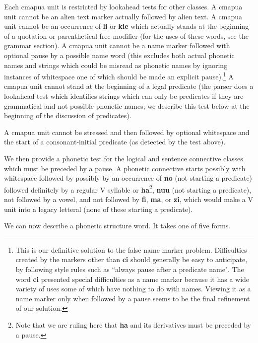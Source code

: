 \documentclass[12pt]{book}
\begin{document}
Each cmapua unit is restricted by lookahead tests for other classes.  A cmapua unit cannot be an alien text marker actually followed by alien text.  A cmapua unit cannot be an occurrence of {\bf li} or {\bf kie} which actually stands at the beginning of a quotation or parenthetical free modifier (for the uses of these words, see the grammar section).  A cmapua unit cannot be a name marker followed with optional pause by a possible name word (this excludes both
actual phonetic names and strings which could be misread as phonetic names by ignoring instances of whitespace one of which should be made an explicit pause).\footnote{This is our definitive solution to the false name marker problem.  Difficulties created by the markers other than {\bf ci} should generally be easy to anticipate, by following style rules such as ``always pause after a predicate name".  The word {\bf ci} presented special difficulties as a name marker because it has a wide variety of uses some of which have nothing to do with names.  Viewing it as a name marker only when followed by a pause seems to be the final refinement of our solution.}   A cmapua unit
cannot stand at the beginning of a legal predicate (the parser  does a lookahead test which identifies strings which can only be predicates if they are grammatical and not possible phonetic names;  we describe this test below at the beginning of the discussion of predicates).  

A cmapua unit cannot be stressed and then followed by optional whitespace and the start of a consonant-initial predicate (as detected by the test above).

We then provide a phonetic test for the logical and sentence connective classes which must be preceded by a pause.  A phonetic connective starts possibly with whitespace followed by possibly by an occurrence of 
{\bf no} (not starting a predicate) followed definitely by a regular V syllable or {\bf ha}\footnote{Note that we are ruling here that {\bf ha} and its derivatives must be preceded by a pause.}, {\bf nuu} (not starting a predicate), not followed by a vowel, and not followed by {\bf fi}, {\bf ma}, or {\bf zi}, which would make a V unit into a legacy letteral (none of these starting a predicate).

We can now describe a phonetic structure word.  It takes one of five forms.
\end{document}
